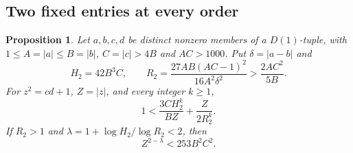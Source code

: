 \documentclass[12pt]{article}
\newtheorem{proposition}[theorem]{Proposition}
\numberwithin{equation}{section}
\begin{document}
\subsection{Two fixed entries at every order}

\begin{proposition}\label{lem:ordinary-all-orders}
Let $a,b,c,d$ be distinct nonzero members of a $D(1)$-tuple, with
$1\le A=|a|\le B=|b|$, $C=|c|>4B$ and $AC>1000$.
Put $\delta=|a-b|$ and
\[
 H_2=42B^3C,\qquad
 R_2=\frac{27AB(AC-1)^2}{16A^2\delta^2}
      >\frac{2AC^2}{5B}.
\]
For $z^2=cd+1$, $Z=|z|$, and every integer $k\ge1$,
\begin{equation}\label{eq:ordinary-integer-k}
 1<\frac{3CH_2^k}{BZ}+\frac{Z}{2R_2^k}.
\end{equation}
If $R_2>1$ and $\lambda=1+\log H_2/\log R_2<2$, then
\begin{equation}\label{eq:ordinary-continuous}
 Z^{2-\lambda}<253B^2C^2.
\end{equation}
\end{proposition}
\end{document}
